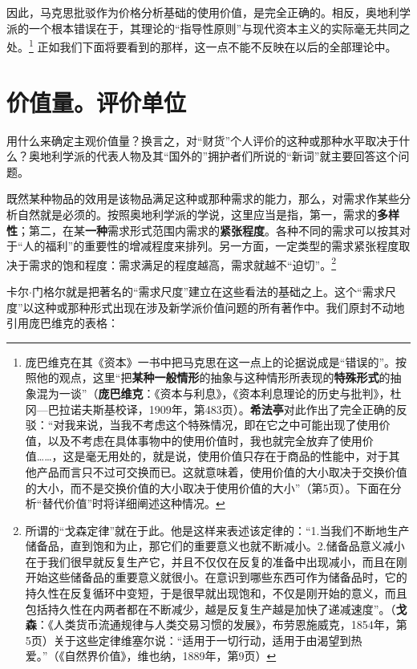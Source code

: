 \documentclass[fontset=fandol, a4paper, 12pt, openright]{ctexbook}
\begin{document}
因此，马克思批驳作为价格分析基础的使用价值，是完全正确的。相反，奥地利学派的一个根本错误在于，其理论的“指导性原则”与现代资本主义的实际毫无共同之处。\footnote{庞巴维克在其《资本》一书中把马克思在这一点上的论据说成是“错误的”。按照他的观点，这里“把\textbf{某种一般情形}的抽象与这种情形所表现的\textbf{特殊形式}的抽象混为一谈”（\textbf{庞巴维克}：《资本与利息》，《资本利息理论的历史与批判》，杜冈—巴拉诺夫斯基校译，1909年，第483页）。\textbf{希法亭}对此作出了完全正确的反驳：“对我来说，当我不考虑这个特殊情况，即在它之中可能出现了使用价值，以及不考虑在具体事物中的使用价值时，我也就完全放弃了使用价值……，这是毫无用处的，就是说，使用价值只存在于商品的性能中，对于其他产品而言只不过可交换而已。这就意味着，使用价值的大小取决于交换价值的大小，而不是交换价值的大小取决于使用价值的大小”（第5页）。下面在分析“替代价值”时将详细阐述这种情况。} 正如我们下面将要看到的那样，这一点不能不反映在以后的全部理论中。

\section{价值量。评价单位}

用什么来确定主观价值量？换言之，对“财货”个人评价的这种或那种水平取决于什么？奥地利学派的代表人物及其“国外的”拥护者们所说的“新词”就主要回答这个问题。

既然某种物品的效用是该物品满足这种或那种需求的能力，那么，对需求作某些分析自然就是必须的。按照奥地利学派的学说，这里应当是指，第一，需求的\textbf{多样性}；第二，在某\textbf{一种}需求形式范围内需求的\textbf{紧张程度}。各种不同的需求可以按其对于“人的福利”的重要性的增减程度来排列。另一方面，一定类型的需求紧张程度取决于需求的饱和程度：需求满足的程度越高，需求就越不“迫切”。\footnote{所谓的“戈森定律”就在于此。他是这样来表述该定律的：“1.当我们不断地生产储备品，直到饱和为止，那它们的重要意义也就不断减小。2.储备品意义减小在于我们很早就反复生产它，并且不仅仅在反复的准备中出现减小，而且在刚开始这些储备品的重要意义就很小。在意识到哪些东西可作为储备品时，它的持久性在反复循环中变短，于是很早就出现饱和，不仅是刚开始的意义，而且包括持久性在内两者都在不断减少，越是反复生产越是加快了递减速度”。（\textbf{戈森}：《人类货币流通规律与人类交易习惯的发展》，布劳恩施威克，1854年，第5页）关于这些定律维塞尔说：“适用于一切行动，适用于由渴望到热爱。”（《自然界价值》，维也纳，1889年，第9页）}

卡尔$\cdot$门格尔就是把著名的“需求尺度”建立在这些看法的基础之上。这个“需求尺度”以这种或那种形式出现在涉及新学派价值问题的所有著作中。我们原封不动地引用庞巴维克的表格：
\end{document}
